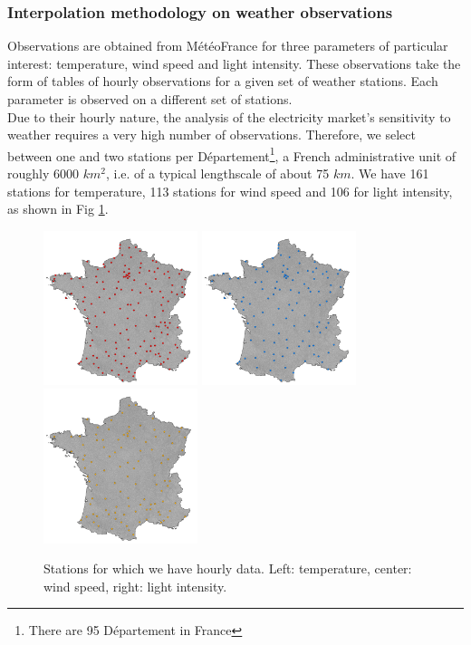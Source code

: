 \subsubsection{Interpolation methodology on weather observations}
\label{interpmethodo}

Observations are obtained from M\'{e}t\'{e}oFrance for three parameters of particular interest: temperature, wind speed and light intensity. These observations take the form of tables of hourly observations for a given set of weather stations. Each parameter is observed on a different set of stations.\\ 

Due to their hourly nature, the analysis of the electricity market's sensitivity to weather requires a very high number of observations. Therefore, we select between one and two stations per D\'{e}partement\footnote{There are 95 D\'{e}partement in France}, a French administrative unit of roughly 6000 $km^2$, i.e. of a typical lengthscale of about 75 $km$. We have 161 stations for temperature, 113 stations for wind speed and 106 for light intensity, as shown in Fig \ref{fig:stations}. \\


\begin{figure}[!ht]
\begin{center} \includegraphics[height=45mm]{forqgis/stationstemp.pdf} \hspace{0.05cm}\includegraphics[height=45mm]{forqgis/stationswind.pdf}
\hspace{0.05cm}\includegraphics[height=45mm]{forqgis/stationslum.pdf}
 \end{center}
\caption{Stations for which we have hourly data. Left: temperature, center: wind speed, right: light intensity.}
\label{fig:stations}
\end{figure}

